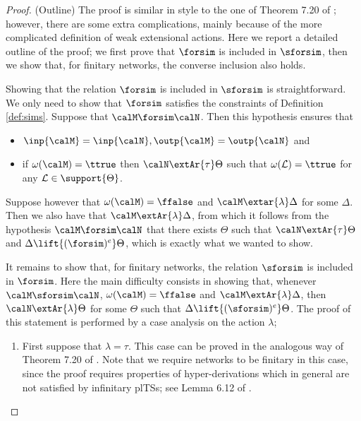 \documentclass{LMCS}
\newcommand{\calL}{\ensuremath{{\mathcal{L}}}}
\begin{document}
\begin{proof}(Outline)
The proof is similar in style to the one of Theorem 7.20 of \cite{DGHM09full}; however, there are some extra complications, mainly because of the more complicated definition of weak extensional actions. 
Here we report a detailed outline of the proof; we first prove that 
$\forsim$ is included in $\sforsim$, then we show that, for finitary networks, 
the converse inclusion also holds.

Showing that the relation $\forsim$ is included in $\sforsim$ is straightforward. 
We only need to show that $\forsim$ satisfies the constraints of Definition \ref{def:sims}.
Suppose that $\calM \forsim \calN$. Then this hypothesis ensures that 
\begin{itemize}
\item 
$\inp{\calM} = \inp{\calN}, \outp{\calM} = \outp{\calN}$ and 
\item if $\omega(\calM) = \ttrue$ then $\calN \extAr{\tau} \Theta$ such that 
$\omega(\calL) = \ttrue$ for any $\calL \in \support{\Theta}$.
\end{itemize}
Suppose however that $\omega(\calM) = \ffalse$ and $\calM \extar{\lambda} \Delta$ 
for some $\Delta$. Then we also have that $\calM \extAr{\lambda} \Delta$, from which 
it follows from the hypothesis $\calM \forsim \calN$ that there exists $\Theta$ 
such that $\calN \extAr{\tau} \Theta$ and $\Delta \lift{(\forsim)^e} \Theta$, which is exactly 
what we wanted to show.

It remains to show that, for finitary networks, the relation $\sforsim$ is included in $\forsim$. 
Here the main difficulty consists in showing that, whenever $\calM \sforsim \calN$, 
$\omega(\calM) = \ffalse$ and $\calM \extAr{\lambda} \Delta$, then $\calN \extAr{\lambda} \Theta$ 
for some $\Theta$ such that $\Delta \lift{(\sforsim)^e} \Theta$. 
The proof of this statement is performed by a case analysis on the action $\lambda$;

\begin{enumerate}
\item First suppose that $\lambda = \tau$.
This case can be proved in the analogous way of 
Theorem 7.20 of \cite{DGHM09full}. Note that we require networks to be finitary in this 
case, since the proof requires properties of hyper-derivations 
which in general are not satisfied by infinitary plTSs; see Lemma 6.12 of \cite{DGHM09full}.


\end{enumerate}
\end{proof}
\end{document}
